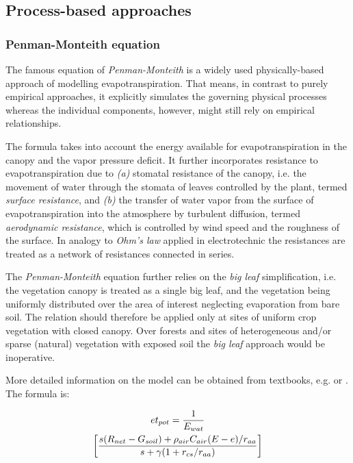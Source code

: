 \subsection{Process-based approaches}\label{sec:et:proc}

\subsubsection{Penman-Monteith equation} \label{sec:et:penmon}

The famous equation of \emph{Penman-Monteith} is a widely used physically-based approach of modelling evapotranspiration. That means, in contrast to purely empirical approaches, it explicitly simulates the governing physical processes whereas the individual components, however, might still rely on empirical relationships. 

The formula takes into account the energy available for evapotranspiration in the canopy and the vapor pressure deficit. It further incorporates resistance to evapotranspiration due to \emph{(a)} stomatal resistance of the canopy, i.e. the movement of water through the stomata of leaves controlled by the plant, termed \emph{surface resistance}, and \emph{(b)} the transfer of water vapor from the surface of evapotranspiration into the atmosphere by turbulent diffusion, termed \emph{aerodynamic resistance}, which is controlled by wind speed and the roughness of the surface. In analogy to \emph{Ohm's law} applied in electrotechnic the resistances are treated as a network of resistances connected in series.

The \emph{Penman-Monteith} equation further relies on the \emph{big leaf} simplification, i.e. the vegetation canopy is treated as a single big leaf, and the vegetation being uniformly distributed over the area of interest neglecting evaporation from bare soil. The relation should therefore be applied only at sites of uniform crop vegetation with closed canopy. Over forests and sites of heterogeneous and/or sparse (natural) vegetation with exposed soil the \emph{big leaf} approach would be inoperative.

More detailed information on the model can be obtained from textbooks, e.g. \citet{Maidment1993} or \citet{Dyck1995}. The formula is:

\begin{multline} \label{eqn:et:penmon}
  et_{pot} =  \frac{1}{E_{wat}{}} \\
  \left[ \frac{s{} (R_{net}{} - G_{soil}{}) + \rho_{air}{} C_{air}{} (E{} - e{}) / r_{aa}}{s{} + \gamma{} (1 + r_{cs} / r_{aa})} \right]
\end{multline}

